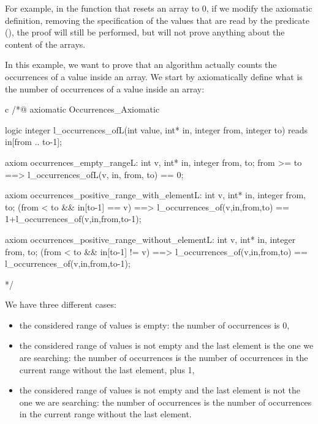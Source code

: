 For example, in the function that resets an array to 0, if we modify the
axiomatic definition, removing the specification of the values that are
read by the predicate (), the proof
will still be performed, but will not prove anything about the content
of the arrays.





In this example, we want to prove that an algorithm actually counts the
occurrences of a value inside an array. We start by axiomatically define
what is the number of occurrences of a value inside an array:



\begin{CodeBlock}{c}
/*@
  axiomatic Occurrences_Axiomatic{
    logic integer l_occurrences_of{L}(int value, int* in, integer from, integer to)
      reads in[from .. to-1];

    axiom occurrences_empty_range{L}:
      \forall int v, int* in, integer from, to;
        from >= to ==> l_occurrences_of{L}(v, in, from, to) == 0;

    axiom occurrences_positive_range_with_element{L}:
      \forall int v, int* in, integer from, to;
        (from < to && in[to-1] == v) ==>
      l_occurrences_of(v,in,from,to) == 1+l_occurrences_of(v,in,from,to-1);

    axiom occurrences_positive_range_without_element{L}:
      \forall int v, int* in, integer from, to;
        (from < to && in[to-1] != v) ==>
      l_occurrences_of(v,in,from,to) == l_occurrences_of(v,in,from,to-1);
  }
*/
\end{CodeBlock}



We have three different cases:

\begin{itemize}
\item
  the considered range of values is empty: the number of occurrences is
  0,
\item
  the considered range of values is not empty and the last element is
  the one we are searching: the number of occurrences is the number of
  occurrences in the current range without the last element, plus 1,
\item
  the considered range of values is not empty and the last element is
  not the one we are searching: the number of occurrences is the number
  of occurrences in the current range without the last element.
\end{itemize}

